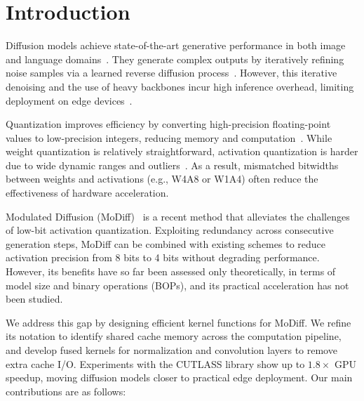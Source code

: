 \section{Introduction}

Diffusion models achieve state-of-the-art generative performance in both image and language domains~\cite{ho2020ddpm,dhariwal2021diffusion,rombach2022ldm}. They generate complex outputs by iteratively refining noise samples via a learned reverse diffusion process~\cite{sohl2015deep,ho2020ddpm}. However, this iterative denoising and the use of heavy backbones incur high inference overhead, limiting deployment on edge devices~\cite{rombach2022ldm}.

Quantization improves efficiency by converting high-precision floating-point values to low-precision integers, reducing memory and computation~\cite{jacob2018quantization,gholami2021survey}. While weight quantization is relatively straightforward, activation quantization is harder due to wide dynamic ranges and outliers~\cite{banner2019post}. As a result, mismatched bitwidths between weights and activations (e.g., W4A8 or W1A4) often reduce the effectiveness of hardware acceleration.

Modulated Diffusion (MoDiff)~\cite{gao2025modulateddiffusionacceleratinggenerative} is a recent method that alleviates the challenges of low-bit activation quantization. Exploiting redundancy across consecutive generation steps, MoDiff can be combined with existing schemes to reduce activation precision from 8 bits to 4 bits without degrading performance. However, its benefits have so far been assessed only theoretically, in terms of model size and binary operations (BOPs), and its practical acceleration has not been studied.

We address this gap by designing efficient kernel functions for MoDiff. We refine its notation to identify shared cache memory across the computation pipeline, and develop fused kernels for normalization and convolution layers to remove extra cache I/O. Experiments with the CUTLASS library show up to $1.8\times$ GPU speedup, moving diffusion models closer to practical edge deployment. Our main contributions are as follows:

